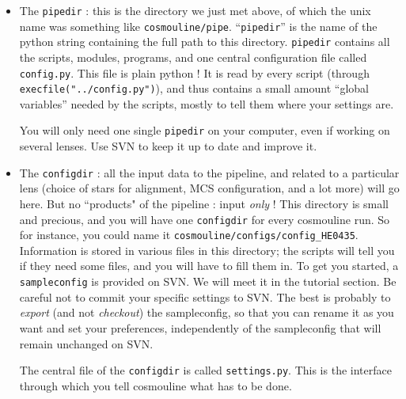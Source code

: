 \begin{itemize}

\item The \verb+pipedir+ : this is the directory we just met above, of which the unix name was something like \verb+cosmouline/pipe+. ``\verb+pipedir+'' is the name of the python string containing the full path to this directory.  \verb+pipedir+ contains all the scripts, modules, programs, and one central configuration file called \verb+config.py+. This file is plain python ! It is read by every script (through \verb+execfile("../config.py")+), and thus contains a small amount ``global variables'' needed by the scripts, mostly to tell them where your settings are.

You will only need one single \verb+pipedir+ on your computer, even if working on several lenses. Use SVN to keep it up to date and improve it.





\item The \verb+configdir+ : all the input data to the pipeline, and related to a particular lens (choice of stars for alignment, MCS configuration, and a lot more) will go here. But no ``products" of the pipeline : input \emph{only} ! This directory is small and precious, and you will have one \verb+configdir+ for every cosmouline run. So for instance, you could name it \verb+cosmouline/configs/config_HE0435+. Information is stored in various files in this directory; the scripts will tell you if they need some files, and you will have to fill them in.
To get you started, a \verb+sampleconfig+ is provided on SVN. We will meet it in the tutorial section. Be careful not to commit your specific settings to SVN. The best is probably to \emph{export} (and not \emph{checkout}) the sampleconfig, so that you can rename it as you want and set your preferences, independently of the sampleconfig that will remain unchanged on SVN.

The central file of the \verb+configdir+ is called \verb+settings.py+. This is the interface through which you tell cosmouline what has to be done.



\end{itemize}
